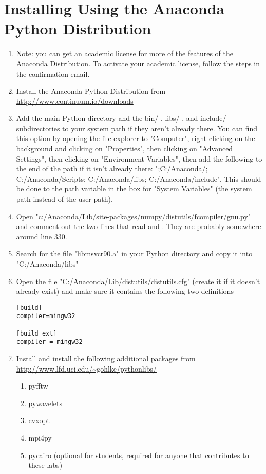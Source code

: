 \section*{Installing Using the Anaconda Python Distribution}
\begin{enumerate}
\item Note: you can get an academic license for more of the features of the Anaconda Distribution.
To activate your academic license, follow the steps in the confirmation email.

\item Install the Anaconda Python Distribution from \url{http://www.continuum.io/downloads}

\item Add the main Python directory and the bin/ , libs/ , and include/ subdirectories to your system path if they aren't already there.
You can find this option by opening the file explorer to "Computer", right clicking on the background and clicking on "Properties", then clicking on "Advanced Settings", then clicking on "Environment Variables", then add the following to the end of the path if it isn't already there: ";C:/Anaconda/; C:/Anaconda/Scripts; C:/Anaconda/libs; C:/Anaconda/include". This should be done to the path variable in the box for "System Variables" (the system path instead of the user path).

\item Open "c:/Anaconda/Lib/site-packages/numpy/distutils/fcompiler/gnu.py" and comment out the two lines that read  and .
They are probably somewhere around line $330$.

\item Search for the file "libmsvcr90.a" in your Python directory and copy it into "C:/Anaconda/libs"

\item Open the file "C:/Anaconda/Lib/distutils/distutils.cfg" (create it if it doesn't already exist) and make sure it contains the following two definitions
\begin{lstlisting}
[build]
compiler=mingw32

[build_ext]
compiler = mingw32 

\end{lstlisting}

\item Install and install the following additional packages from \url{http://www.lfd.uci.edu/~gohlke/pythonlibs/}
\begin{enumerate}
	\item pyfftw
	\item pywavelets
	\item cvxopt
	\item mpi4py
	\item pycairo (optional for students, required for anyone that contributes to these labs)
\end{enumerate}


\end{enumerate}
